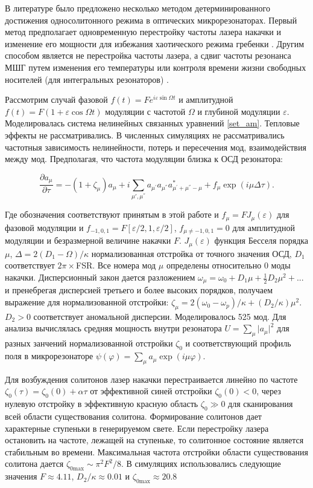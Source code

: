 В литературе было предложено несколько методом детерминированного достижения односолитонного режима в оптических микрорезонаторах. Первый метод предполагает одновременную перестройку частоты лазера накачки и изменение его мощности для избежания хаотического режима гребенки \cite{Jaramillo2015}. Другим способом является не перестройка частоты лазера, а сдвиг частоты резонанса МШГ путем изменения его температуры \cite{Joshi2016} или контроля времени жизни свободных носителей (для интегральных резонаторов) \cite{Yu2016}.

Рассмотрим случай фазовой $f(t)=F e^{i\varepsilon\sin\Omega t}$ и амплитудной $f(t)=F(1+\varepsilon\cos\Omega t)$  модуляции с частотой $\Omega$ и глубиной модуляции $\varepsilon$. Моделировалась система нелинейных связанных уравнений \ref{set_am}. Тепловые эффекты не рассматривались. В численных симуляциях не рассматривались частотныя зависимость нелинейности, потерь и пересечения мод, взаимодействия между мод. Предполагая, что частота модуляции близка к ОСД резонатора:
 
\begin{equation}
\frac{\partial a_\mu}{\partial \tau}=-(1+\zeta_\mu)a_\mu+i\sum_{\mu',\mu^{''}}a_{\mu^{'}} a_{\mu^{''}} a^{*}_{\mu^{'}+\mu^{''}-\mu}+f_{\mu}\exp(i\mu\Delta\tau).
\end{equation}

Где обозначения соответствуют принятым в этой работе и $f_\mu=F J_\mu(\varepsilon)$ для фазовой модуляции и $f_{-1,0,1}=F[\varepsilon/2,1,\varepsilon/2]$,  $f_{\mu \neq -1,0,1}=0$ для амплитудной модуляции и безразмерной величине накачки $F$. $J_\mu(\varepsilon)$ функция Бесселя порядка $\mu$, $\Delta=2(D_1-\Omega)/\kappa$ нормализованная отстройка от точного значения ОСД, $D_1$ соответствует $2\pi\times$FSR. Все номера мод $\mu$ определены относительно 0 моды накачки. Дисперсионный закон дается разложением $\omega_\mu=\omega_0+D_1\mu+\frac{1}{2}D_2\mu^2+...$ и пренебрегая дисперсией третьего и более высоких порядков, получаем выражение для нормализованной отстройки: $\zeta_\mu=2(\omega_0-\omega_p)/\kappa+(D_2/\kappa)\mu^2$. $D_2>0$ соответствует аномальной дисперсии. Моделировалось 525 мод. Для анализа вычислялась средняя мощность внутри резонатора $U=\sum_{\mu} \vert a_\mu\vert^2$ для разных занчений нормализованной отстройки $\zeta_0$ и соответствующий профиль поля в микрорезонаторе $\psi(\varphi)=\sum_{\mu} a_{\mu}\exp(i\mu\varphi)$.

Для возбуждения солитонов лазер накачки перестраивается линейно по частоте $\zeta_{0}(\tau)=\zeta_{0}(0)+\alpha\tau$ от эффективной синей отстройки $\zeta_0(0)<0$, через нулевую отстройку в эффективную красную область $\zeta_0\gg0$ для сканирования всей области существования солитона. Формирование солитонов дает характерные ступеньки в генерируемом свете. Если перестройку лазера остановить на частоте, лежащей на ступеньке, то солитонное состояние является стабильным во времени. Максимальная частота отстройки области существования солитона \cite{Herr2014} дается $\zeta_{0\text{max}}\sim {\pi^2 F^2}/{8}$. В симуляциях использовались следующие значения $F\approx 4.11$, $D_{2}/\kappa\approx {0.01}$ и $\zeta_{0\text{max}}\approx 20.8$

